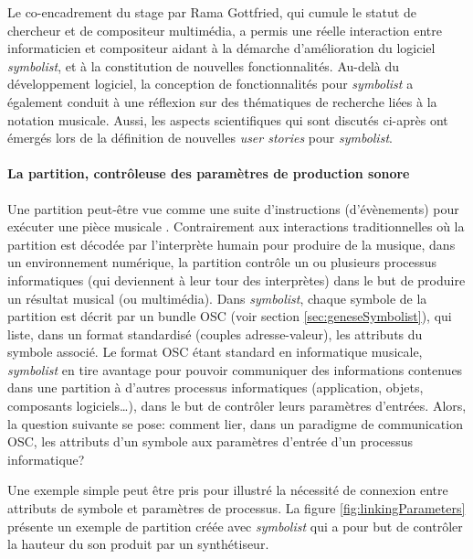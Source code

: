 Le co-encadrement du stage par Rama Gottfried, qui cumule le statut de chercheur et de compositeur multimédia, a permis une réelle interaction entre informaticien et compositeur aidant à la démarche d'amélioration du logiciel \textit{symbolist}, et à la constitution de nouvelles fonctionnalités. Au-delà du développement logiciel, la conception de fonctionnalités pour \textit{symbolist} a également conduit à une réflexion sur des thématiques de recherche liées à la notation musicale.
Aussi, les aspects scientifiques qui sont discutés ci-après ont émergés lors de la définition de nouvelles \textit{user stories} pour \textit{symbolist}.

\paragraph{La partition, contrôleuse des paramètres de production sonore} Une partition peut-être vue comme une suite d'instructions (d'évènements) pour exécuter une pièce musicale \cite{bosseur2005}. Contrairement aux interactions traditionnelles où la partition est décodée par l'interprète humain pour produire de la musique, dans un environnement numérique, la partition contrôle un ou plusieurs processus informatiques (qui deviennent à leur tour des interprètes) dans le but de produire un résultat musical (ou multimédia).
Dans \textit{symbolist}, chaque symbole de la partition est décrit par un bundle OSC (voir section \ref{sec:geneseSymbolist}), qui liste, dans un format standardisé (couples adresse-valeur), les attributs du symbole associé.
Le format OSC étant standard en informatique musicale, \textit{symbolist} en tire avantage pour pouvoir communiquer des informations contenues dans une partition à d'autres processus informatiques (application, objets, composants logiciels…), dans le but de contrôler leurs paramètres d'entrées.
Alors, la question suivante se pose: comment lier, dans un paradigme de communication OSC, les attributs d'un symbole aux paramètres d'entrée d'un processus informatique?

Une exemple simple peut être pris pour illustré la nécessité de connexion entre attributs de symbole et paramètres de processus. La figure \ref{fig:linkingParameters} présente un exemple de partition créée avec \textit{symbolist} qui a pour but de contrôler la hauteur du son produit par un synthétiseur.

